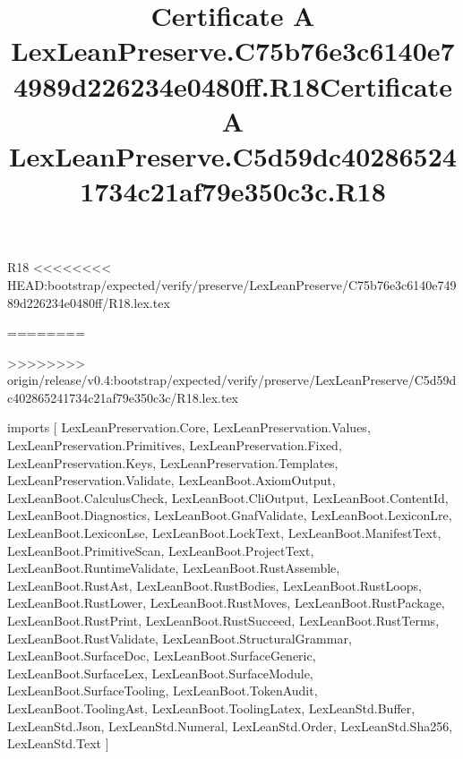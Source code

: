 \begin{lexlean}{R18}
<<<<<<<< HEAD:bootstrap/expected/verify/preserve/LexLeanPreserve/C75b76e3c6140e74989d226234e0480ff/R18.lex.tex
\title{Certificate A LexLeanPreserve.C75b76e3c6140e74989d226234e0480ff.R18}
========
\title{Certificate A LexLeanPreserve.C5d59dc402865241734c21af79e350c3c.R18}
>>>>>>>> origin/release/v0.4:bootstrap/expected/verify/preserve/LexLeanPreserve/C5d59dc402865241734c21af79e350c3c/R18.lex.tex
\begin{coremodule}
imports [
  LexLeanPreservation.Core,
  LexLeanPreservation.Values,
  LexLeanPreservation.Primitives,
  LexLeanPreservation.Fixed,
  LexLeanPreservation.Keys,
  LexLeanPreservation.Templates,
  LexLeanPreservation.Validate,
  LexLeanBoot.AxiomOutput,
  LexLeanBoot.CalculusCheck,
  LexLeanBoot.CliOutput,
  LexLeanBoot.ContentId,
  LexLeanBoot.Diagnostics,
  LexLeanBoot.GnafValidate,
  LexLeanBoot.LexiconLre,
  LexLeanBoot.LexiconLse,
  LexLeanBoot.LockText,
  LexLeanBoot.ManifestText,
  LexLeanBoot.PrimitiveScan,
  LexLeanBoot.ProjectText,
  LexLeanBoot.RuntimeValidate,
  LexLeanBoot.RustAssemble,
  LexLeanBoot.RustAst,
  LexLeanBoot.RustBodies,
  LexLeanBoot.RustLoops,
  LexLeanBoot.RustLower,
  LexLeanBoot.RustMoves,
  LexLeanBoot.RustPackage,
  LexLeanBoot.RustPrint,
  LexLeanBoot.RustSucceed,
  LexLeanBoot.RustTerms,
  LexLeanBoot.RustValidate,
  LexLeanBoot.StructuralGrammar,
  LexLeanBoot.SurfaceDoc,
  LexLeanBoot.SurfaceGeneric,
  LexLeanBoot.SurfaceLex,
  LexLeanBoot.SurfaceModule,
  LexLeanBoot.SurfaceTooling,
  LexLeanBoot.TokenAudit,
  LexLeanBoot.ToolingAst,
  LexLeanBoot.ToolingLatex,
  LexLeanStd.Buffer,
  LexLeanStd.Json,
  LexLeanStd.Numeral,
  LexLeanStd.Order,
  LexLeanStd.Sha256,
  LexLeanStd.Text
]


\end{coremodule}
\end{lexlean}
